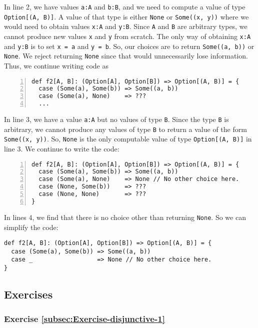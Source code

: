 \noindent In line 2, we have values \lstinline!a:A! and \lstinline!b:B!,
and we need to compute a value of type \lstinline!Option[(A, B)]!.
A value of that type is either \lstinline!None! or \lstinline!Some((x, y))!
where we would need to obtain values \lstinline!x:A! and \lstinline!y:B!.
Since \lstinline!A! and \lstinline!B! are arbitrary types, we cannot
produce new values \lstinline!x! and \lstinline!y! from scratch.
The only way of obtaining \lstinline!x:A! and \lstinline!y:B! is
to set \lstinline!x = a! and \lstinline!y = b!. So, our choices
are to return \lstinline!Some((a, b))! or \lstinline!None!. We reject
returning \lstinline!None! since that would unnecessarily lose information.
Thus, we continue writing code as
\begin{lstlisting}[numbers=left,numberstyle={\small}]
def f2[A, B]: (Option[A], Option[B]) => Option[(A, B)] = {
  case (Some(a), Some(b)) => Some((a, b))
  case (Some(a), None)    => ???
  ...
\end{lstlisting}
In line 3, we have a value \lstinline!a:A! but no values of type
\lstinline!B!. Since the type \lstinline!B! is arbitrary, we cannot
produce any values of type \lstinline!B! to return a value of the
form \lstinline!Some((x, y))!. So, \lstinline!None! is the only
computable value of type \lstinline!Option[(A, B)]! in line 3. We
continue to write the code:
\begin{lstlisting}[numbers=left,numberstyle={\small}]
def f2[A, B]: (Option[A], Option[B]) => Option[(A, B)] = {
  case (Some(a), Some(b)) => Some((a, b))
  case (Some(a), None)    => None // No other choice here.
  case (None, Some(b))    => ???
  case (None, None)       => ???
}
\end{lstlisting}
In lines 4, we find that there is no choice other than
returning \lstinline!None!. So we can simplify the code:
\begin{lstlisting}
def f2[A, B]: (Option[A], Option[B]) => Option[(A, B)] = {
  case (Some(a), Some(b)) => Some((a, b))
  case _                  => None // No other choice here.
}
\end{lstlisting}


\subsection{Exercises}

\subsubsection{Exercise \label{subsec:Exercise-disjunctive-1}\ref{subsec:Exercise-disjunctive-1}}

